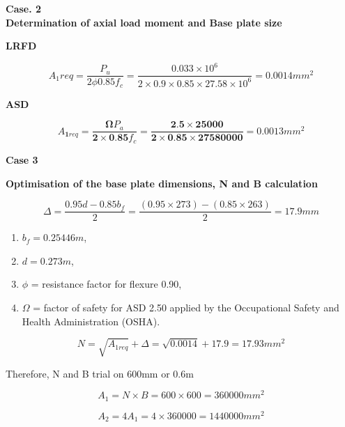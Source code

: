 {\textbf{Case. 2}\\ 

\textbf{Determination of axial load moment and Base plate size }

\textbf{LRFD}

\begin{equation}
A_{1}{req} = \frac{{P}_{u}}{{2} \phi {0.85}{f}_{c}} = \frac{0.033 \times 10^6}{2\times0.9\times0.85\times 27.58 \times10^6} = 0.0014 mm^2
\end{equation}



\textbf{ASD}

\begin{equation}
{A}_{\mathbf{1}{req}}= \frac{{\mathbf{\Omega}{P}}_a}{\mathbf{2}\times \mathbf{0}.\mathbf{85}{f}_{c}}= \frac{\mathbf{2}.\mathbf{5}\times\mathbf{25000}}{\mathbf{2}\times\mathbf{0}.\mathbf{85}\times\mathbf{27580000}} = 0.0013{{mm}}^{2}
\end{equation}

\textbf{Case 3}

\textbf{Optimisation of the base plate dimensions, N and B calculation}

\begin{equation}
\Delta = \frac{0.95d-0.85b_f}{2} =\frac{\left(0.95\times273\right)-(0.85\times263)}{2} = 17.9mm
\end{equation}

\begin{enumerate}[label={}]
    \item \({b}_{f}= 0.25446m\),
\item\(d= 0.273m\),
\item\(\phi\) = resistance factor for flexure 0.90,
\item \( \Omega\) = factor of safety for ASD 2.50 applied by the Occupational Safety and Health Administration (OSHA).
\end{enumerate}


\begin{equation}
    N =\sqrt{A_{1req}} + \Delta = \sqrt{0.0014} + 17.9 = 17.93mm^2 
\end{equation}


Therefore, N and B trial on 600mm or 0.6m

\begin{equation}
    A_{1} = N \times B = 600 \times 600 = 360000mm^2
\end{equation}


\begin{equation}
    A_2 = {4}{A_1} = 4\times360000 = 1440000mm^2
\end{equation}




}
